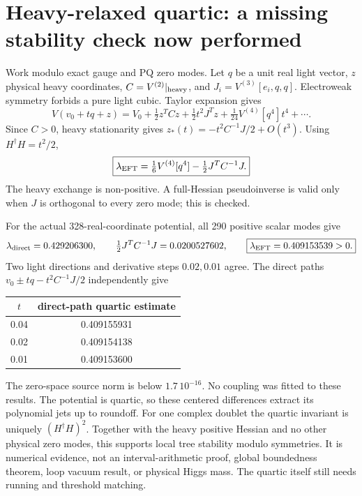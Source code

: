 \documentclass[11pt]{article}
\begin{document}
\section{Heavy-relaxed quartic: a missing stability check now performed}
Work modulo exact gauge and PQ zero modes. Let $q$ be a unit real light
vector, $z$ physical heavy coordinates, $C=V^{(2)}|_{\rm heavy}$,
and $J_i=V^{(3)}[e_i,q,q]$. Electroweak symmetry forbids a pure light
cubic. Taylor expansion gives
\[
V(v_0+tq+z)=V_0+\tfrac12z^TCz+\tfrac12t^2J^Tz+
\tfrac1{24}V^{(4)}[q^4]t^4+\cdots .
\]
Since $C>0$, heavy stationarity gives
$z_*(t)=-t^2C^{-1}J/2+O(t^3)$. Using $H^\dagger H=t^2/2$,
\begin{equation}
\boxed{\lambda_{\rm EFT}
=\tfrac16V^{(4)}[q^4]-\tfrac12J^TC^{-1}J.}
\label{eq:quartic}
\end{equation}
The heavy exchange is non-positive. A full-Hessian pseudoinverse is
valid only when $J$ is orthogonal to every zero mode; this is checked.

For the actual 328-real-coordinate potential, all 290 positive scalar
modes give
\[
\lambda_{\rm direct}=0.429206300,\qquad
\tfrac12J^TC^{-1}J=0.0200527602,\qquad
\boxed{\lambda_{\rm EFT}=0.409153539>0.}
\]
Two light directions and derivative steps $0.02,0.01$ agree.
The direct paths $v_0\pm tq-t^2C^{-1}J/2$ independently give
\begin{center}
\begin{tabular}{cc}
\toprule
$t$ & direct-path quartic estimate\\
\midrule
0.04 & 0.409155931\\
0.02 & 0.409154138\\
0.01 & 0.409153600\\
\bottomrule
\end{tabular}
\end{center}
The zero-space source norm is below $1.7\,10^{-16}$.
No coupling was fitted to these results. The potential is quartic, so
these centered differences extract its polynomial jets up to roundoff.
For one complex doublet the quartic invariant is uniquely
$(H^\dagger H)^2$. Together with the heavy positive Hessian and no
other physical zero modes, this supports local tree stability modulo
symmetries. It is numerical evidence, not an interval-arithmetic proof,
global boundedness theorem, loop vacuum result, or physical Higgs mass.
The quartic itself still needs running and threshold matching.
\end{document}
